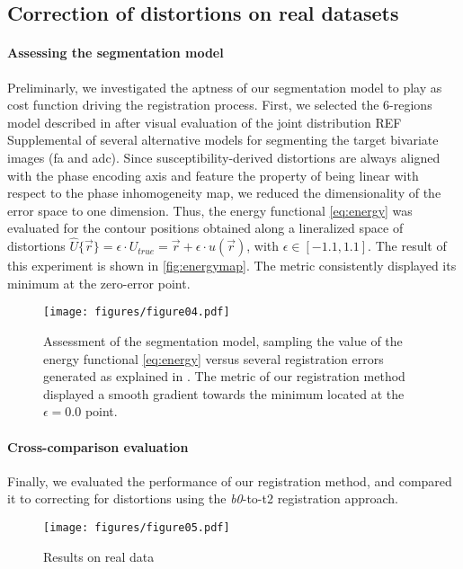 \subsection*{Correction of distortions on real datasets}\label{sec:results_hcp}

\paragraph*{Assessing the segmentation model}\label{sec:res_model_and_metric} %
%
Preliminarly, we investigated the aptness of our segmentation model to play as cost function
  driving the registration process.
First, we selected the 6-regions model described in  after
  visual evaluation of the joint distribution {\color{red} REF Supplemental} of several
  alternative models for segmenting the target bivariate images (\gls*{fa} and \gls*{adc}).
Since susceptibility-derived distortions are always aligned with the phase encoding axis
  and feature the property of being linear with respect to the phase inhomogeneity map,
  we reduced the dimensionality of the error space to one dimension.
Thus, the energy functional \eqref{eq:energy} was evaluated for the contour positions
  obtained along a lineralized space of distortions
  $\hat{U}\{\vec{r}\} = \epsilon \cdot U_{true} = \vec{r} + \epsilon \cdot u(\vec{r})$,
  with $\epsilon \in [-1.1, 1.1]$.
The result of this experiment is shown in \autoref{fig:energymap}.
The metric consistently displayed its minimum at the zero-error point.

\begin{figure}
	\texttt{[image: figures/figure04.pdf]}
	\caption{Assessment of the segmentation model, sampling the value of the energy functional
	\eqref{eq:energy} versus several registration errors generated as explained in
	.
	The metric of our registration method displayed a smooth gradient towards the minimum
	located at the $\epsilon = 0.0$ point.}\label{fig:energymap}
\end{figure}

\paragraph*{Cross-comparison evaluation}\label{sec:res_cc_evaluation}
%
Finally, we evaluated the performance of our registration method, and compared it to correcting
  for distortions using the \emph{b0}-to-\gls*{t2} registration approach.

\begin{figure*}
	\texttt{[image: figures/figure05.pdf]}
	\caption{Results on real data}\label{fig:results_real}
\end{figure*}
